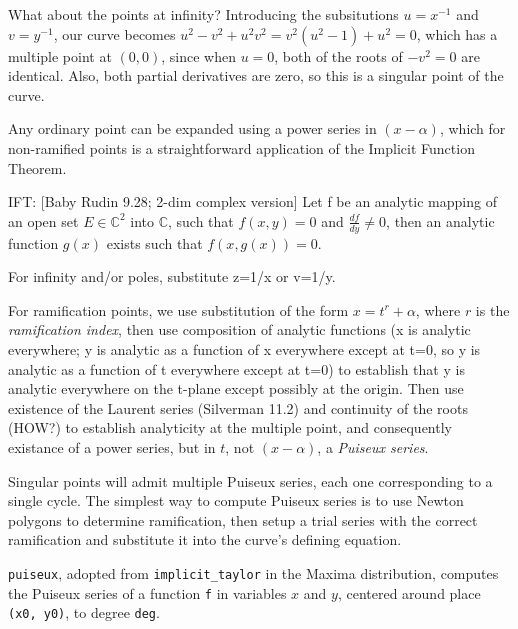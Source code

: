 \begin{figure}[H]
\begin{center}
\end{center}
\end{figure}

What about the points at infinity?  Introducing the subsitutions
$u=x^{-1}$ and $v=y^{-1}$, our curve becomes $u^2 - v^2 + u^2 v^2 =
v^2 (u^2 - 1) + u^2 = 0$, which has a multiple point at $(0,0)$,
since when $u=0$, both of the roots of $-v^2 = 0$ are identical.
Also, both partial derivatives are zero, so this is a singular
point of the curve.

\endexample

Any ordinary point can be expanded using a power series in
$(x-\alpha)$, which for non-ramified points is a straightforward
application of the Implicit Function Theorem.

IFT: [Baby Rudin 9.28; 2-dim complex version] Let f be an analytic
mapping of an open set $E \in {\mathbb C}^2$ into ${\mathbb C}$, such
that $f(x,y)=0$ and $\frac{df}{dy} \ne 0$, then an analytic
function $g(x)$ exists such that $f(x,g(x))=0$.

For infinity and/or poles, substitute z=1/x or v=1/y.

For ramification points, we use substitution of the form
$x=t^r+\alpha$, where $r$ is the {\it ramification index}, then use
composition of analytic functions (x is analytic everywhere; y is
analytic as a function of x everywhere except at t=0, so y is analytic
as a function of t everywhere except at t=0) to establish that y is
analytic everywhere on the t-plane except possibly at the origin.
Then use existence of the Laurent series (Silverman 11.2) and
continuity of the roots (HOW?) to establish analyticity at the
multiple point, and consequently existance of a power series, but in
$t$, not $(x-\alpha)$, a {\it Puiseux series}.

Singular points will admit multiple Puiseux series, each one
corresponding to a single cycle.  The simplest way to compute Puiseux
series is to use Newton polygons to determine ramification,
then setup a trial series with the correct ramification and
substitute it into the curve's defining equation.

{\tt puiseux}, adopted from {\tt implicit_taylor} in the Maxima
distribution, computes the Puiseux series of a function {\tt f} in
variables $x$ and $y$, centered around place {\tt (x0, y0)},
to degree {\tt deg}.

